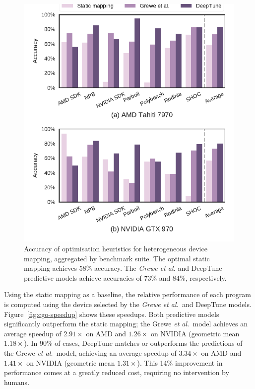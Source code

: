 \begin{figure}
  \centering %
  \includegraphics[width=.85\columnwidth]{img/cgo-acc}%
  \caption[Accuracy of optimisation heuristics for heterogeneous device mapping]{%
    Accuracy of optimisation heuristics for heterogeneous device mapping, aggregated by benchmark suite. The optimal static mapping achieves 58\% accuracy. The \emph{Grewe et al. }and DeepTune predictive models achieve accuracies of 73\% and 84\%, respectively.%
  }
  \label{fig:cgo-accuracy}
\end{figure}

Using the static mapping as a baseline, the relative performance of each program is computed using the device selected by the \emph{Grewe et al.\ }and DeepTune models. Figure~\ref{fig:cgo-speedup} shows these speedups. Both predictive models significantly outperform the static mapping; the Grewe \emph{et al.\ }model achieves an average speedup of $2.91\times$ on AMD and $1.26\times$ on NVIDIA (geometric mean $1.18\times$). In 90\% of cases, DeepTune matches or outperforms the predictions of the Grewe \emph{et al.\ }model, achieving an average speedup of $3.34\times$ on AMD and $1.41\times$ on NVIDIA (geometric mean $1.31\times$). This 14\% improvement in performance comes at a greatly reduced cost, requiring no intervention by humans.

